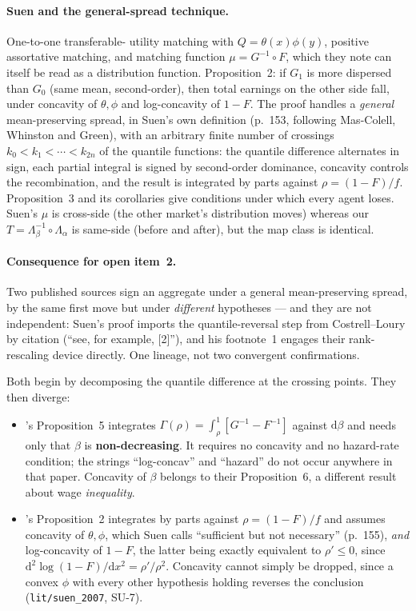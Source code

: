 \documentclass[11pt,a4paper]{article}
\begin{document}
\paragraph{Suen and the general-spread technique.} One-to-one transferable-
utility matching with $Q = \theta(x)\phi(y)$, positive assortative matching, and
matching function $\mu = G^{-1} \circ F$, which they note can itself be read as
a distribution function. Proposition~2: if $G_1$ is more dispersed than $G_0$
(same mean, second-order), then total earnings on the other side fall, under
concavity of $\theta, \phi$ and log-concavity of $1-F$. The proof handles a
\emph{general} mean-preserving spread, in Suen's own definition (p.~153,
following Mas-Colell, Whinston and Green), with an arbitrary finite number of
crossings $k_0 < k_1 < \cdots < k_{2n}$ of the quantile functions: the
quantile difference alternates in sign, each partial integral is signed by
second-order dominance, concavity controls the recombination, and the result
is integrated by parts against $\rho = (1-F)/f$. Proposition~3 and its
corollaries give conditions under which every agent loses. Suen's $\mu$ is
cross-side (the other market's distribution moves) whereas our $T =
\Lambda_\beta^{-1} \circ \Lambda_\alpha$ is same-side (before and after), but
the map class is identical.

\paragraph{Consequence for open item~2.} Two published sources sign an
aggregate under a general mean-preserving spread, by the same first move but
under \emph{different} hypotheses --- and they are not independent: Suen's
proof imports the quantile-reversal step from Costrell--Loury by citation
(``see, for example, [2]''), and his footnote~1 engages their rank-rescaling
device directly. One lineage, not two convergent confirmations.

Both begin by decomposing the quantile difference at the crossing points.
They then diverge:

\begin{itemize}
\item \citet{CostrellLoury2004}'s Proposition~5 integrates
  $\Gamma(\rho) = \int_\rho^1 [G^{-1} - F^{-1}]$ against $\mathrm{d}\beta$ and
  needs only that $\beta$ is \textbf{non-decreasing}. It requires no concavity
  and no hazard-rate condition; the strings ``log-concav'' and ``hazard'' do
  not occur anywhere in that paper. Concavity of $\beta$ belongs to their
  Proposition~6, a different result about wage \emph{inequality}.
\item \citet{Suen2007}'s Proposition~2 integrates by parts against
  $\rho = (1-F)/f$ and assumes concavity of $\theta,\phi$, which Suen calls
  ``sufficient but not necessary'' (p.~155), \emph{and} log-concavity of
  $1-F$, the latter being exactly equivalent to $\rho' \leq 0$, since
  $\mathrm{d}^2 \log(1-F)/\mathrm{d}x^2 = \rho'/\rho^2$. Concavity cannot
  simply be dropped, since a convex $\phi$ with every other hypothesis holding
  reverses the conclusion (\texttt{lit/suen\_2007}, SU-7).
\end{itemize}
\end{document}
